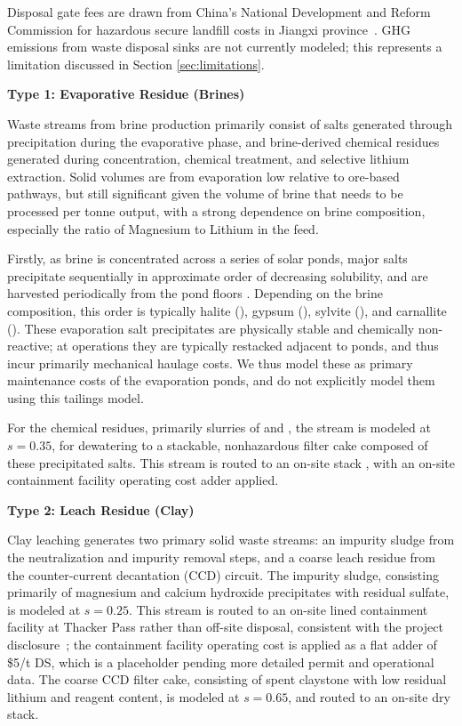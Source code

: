 Disposal gate fees are drawn from China's National Development and Reform Commission for hazardous secure landfill costs in Jiangxi province~\cite{nationaldevelopmentandreformcommission2024}. GHG emissions from waste disposal sinks are not currently modeled; this represents a limitation discussed in Section \ref{sec:limitations}.

\medskip
\noindent\textbf{Type 1: Evaporative Residue (Brines)}\quad

Waste streams from brine production primarily consist of salts generated through precipitation during the evaporative phase, and brine-derived chemical residues generated during concentration, chemical treatment, and selective lithium extraction. Solid volumes are from evaporation low relative to ore-based pathways, but still significant given the volume of brine that needs to be processed per tonne output, with a strong dependence on brine composition, especially the ratio of Magnesium to Lithium in the feed. 

Firstly, as brine is concentrated across a series of solar ponds, major salts precipitate sequentially in approximate order of decreasing solubility, and are harvested periodically from the pond floors \citep{flexerLithiumRecoveryBrines2018, garrettHandbookLithiumNatural2004, becerraTechnicalReportSummary2024}. Depending on the brine composition, this order is typically halite (), gypsum (), sylvite (), and carnallite (). These evaporation salt precipitates are physically stable and chemically non-reactive; at operations they are typically restacked adjacent to ponds, and thus incur primarily mechanical haulage costs. We thus model these as primary maintenance costs of the evaporation ponds, and do not explicitly model them using this tailings model.

For the chemical residues, primarily slurries of  and , the stream is modeled at $s = 0.35$, for dewatering to a stackable, nonhazardous filter cake composed of these precipitated salts. This stream is routed to an on-site stack \cite{srkconsultingSECTechnicalReport2023a}, with an on-site containment facility operating cost adder applied.

\medskip
\noindent\textbf{Type 2: Leach Residue (Clay)}\quad

Clay leaching generates two primary solid waste streams: an impurity sludge from the neutralization and impurity removal steps, and a coarse leach residue from the counter-current decantation (CCD) circuit. The impurity sludge, consisting primarily of magnesium and calcium hydroxide precipitates with residual sulfate, is modeled at $s=0.25$. This stream is routed to an on-site lined containment facility at Thacker Pass rather than off-site disposal, consistent with the project disclosure~\cite{sgscanadaincSK1300Technical2024}; the containment facility operating cost is applied as a flat adder of \$5/t DS, which is a placeholder pending more detailed permit and operational data. The coarse CCD filter cake, consisting of spent claystone with low residual lithium and reagent content, is modeled at $s=0.65$, and routed to an on-site dry stack.

